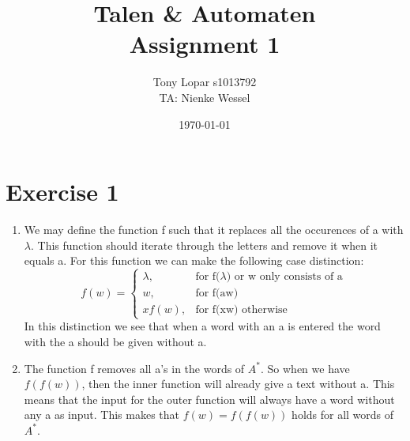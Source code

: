 \documentclass{article}
\begin{document}
\title{Talen \& Automaten \\ Assignment 1}
\date{\today}
\author{Tony Lopar \enspace s1013792 \\TA: Nienke Wessel}
\maketitle

\section*{Exercise 1}
\begin{enumerate}[label=\alph*]
  \item We may define the function f such that it replaces all the occurences of a with $\lambda$. This function should iterate through the letters and remove it when it equals a. For this function we can make the following case distinction:
  \begin{equation*}
    f(w) =
    \begin{cases*}
        \lambda , & \text{for f($\lambda$) or w only consists of a}   \\
        w, & \text{for f(aw)} \\
        xf(w), & \text{for f(xw) otherwise}
    \end{cases*}
  \end{equation*}
  In this distinction we see that when a word with an a is entered the word with the a should be given without a.
  \item The function f removes all a's in the words of $A^*$. So when we have $f(f(w))$, then the inner function will already give a text without a. This means that the input for the outer function will always have a word without any a as input. This makes that $f(w) = f(f(w))$ holds for all words of $A^*$.
\end{enumerate}
\end{document}
